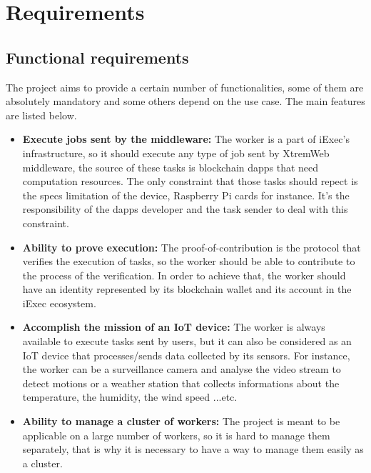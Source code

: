         \clearpage

\section{Requirements}
    \subsection{Functional requirements}
        The project aims to provide a certain number of functionalities, some of them are absolutely mandatory
        and some others depend on the use case. The main features are listed below.
        \begin{itemize}
            \item \textbf{Execute jobs sent by the middleware:} The worker is a part of iExec's infrastructure, so it
            should execute any type of job sent by XtremWeb middleware, the source of these tasks is blockchain
            dapps that need computation resources. The only constraint that those tasks should repect is the
            specs limitation of the device, Raspberry Pi cards for instance. It's the responsibility of
            the dapps developer and the task sender to deal with this constraint.

            \item \textbf{Ability to prove execution:} The proof-of-contribution\cite{POCO} is the protocol that
            verifies the execution of tasks, so the worker should be able to contribute to the process of the
            verification. In order to achieve that, the worker should have an identity represented by its
            blockchain wallet and its account in the iExec ecosystem.

            \item \textbf{Accomplish the mission of an IoT device:} The worker is always available to execute tasks sent by
            users, but it can also be considered as an IoT device that processes/sends data collected by its sensors.
            For instance, the worker can be a surveillance camera and analyse the video stream to detect motions or
            a weather station that collects informations about the temperature, the humidity, the wind speed ...etc.

            \item \textbf{Ability to manage a cluster of workers:} The project is meant to be applicable on a large number of
            workers, so it is hard to manage them separately, that is why it is necessary to have a way to manage them
            easily as a cluster.
        \end{itemize}

